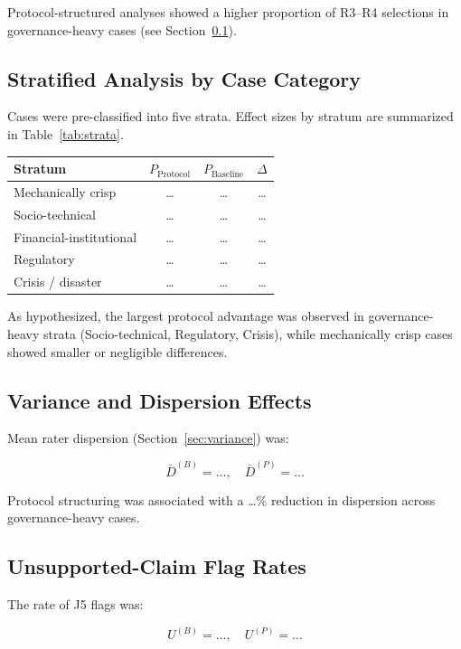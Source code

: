 Protocol-structured analyses showed a higher proportion of R3--R4 selections in governance-heavy cases (see Section~\ref{sec:strata}).

\subsection{Stratified Analysis by Case Category}
\label{sec:strata}

Cases were pre-classified into five strata. Effect sizes by stratum are summarized in Table~\ref{tab:strata}.

\begin{center}
\begin{tabular}{lccc}
\toprule
Stratum & $P_{\text{Protocol}}$ & $P_{\text{Baseline}}$ & $\Delta$ \\
\midrule
Mechanically crisp & \ldots & \ldots & \ldots \\
Socio-technical & \ldots & \ldots & \ldots \\
Financial-institutional & \ldots & \ldots & \ldots \\
Regulatory & \ldots & \ldots & \ldots \\
Crisis / disaster & \ldots & \ldots & \ldots \\
\bottomrule
\end{tabular}
\end{center}

As hypothesized, the largest protocol advantage was observed in governance-heavy strata (Socio-technical, Regulatory, Crisis), while mechanically crisp cases showed smaller or negligible differences.

\subsection{Variance and Dispersion Effects}

Mean rater dispersion (Section~\ref{sec:variance}) was:

\[
\bar{D}^{(B)} = \ldots, \quad \bar{D}^{(P)} = \ldots
\]

Protocol structuring was associated with a \ldots\% reduction in dispersion across governance-heavy cases.

\subsection{Unsupported-Claim Flag Rates}

The rate of J5 flags was:

\[
U^{(B)} = \ldots, \quad U^{(P)} = \ldots
\]

